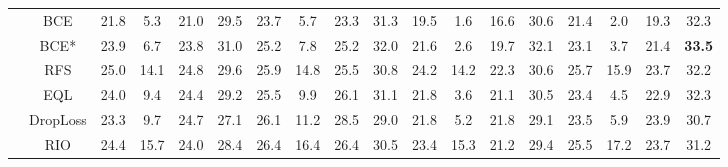 \documentclass[lettersize,journal]{IEEEtran}
\begin{document}
\begin{table*}[t]
{\begin{tabular}{c|c|cccccccc|cccccccc}
                                     & BCE\cite{ren2015faster}               & 21.8          & 5.3           & 21.0          & \multicolumn{1}{c|}{29.5}          & 23.7          & 5.7           & 23.3          & 31.3          & \multicolumn{1}{c|}{19.5}          & 1.6           & 16.6          & \multicolumn{1}{c|}{30.6}          & \multicolumn{1}{c|}{21.4}          & 2.0           & 19.3          & 32.3          \\
                                     & BCE*\cite{ren2015faster}                   & 23.9          & 6.7           & 23.8          & \multicolumn{1}{c|}{31.0}          & 25.2          & 7.8           & 25.2          & 32.0          & \multicolumn{1}{c|}{21.6}          & 2.6           & 19.7          & \multicolumn{1}{c|}{32.1}          & \multicolumn{1}{c|}{23.1}          & 3.7           & 21.4          & \textbf{33.5} \\
                                     & RFS\cite{gupta2019lvis}                      & 25.0          & 14.1          & 24.8          & \multicolumn{1}{c|}{29.6}          & 25.9          & 14.8          & 25.5          & 30.8          & \multicolumn{1}{c|}{24.2}          & 14.2          & 22.3          & \multicolumn{1}{c|}{30.6}          & \multicolumn{1}{c|}{25.7}          & 15.9          & 23.7          & 32.2          \\
                                     & EQL\cite{tan2020equalization}                      & 24.0          & 9.4           & 24.4          & \multicolumn{1}{c|}{29.2}          & 25.5          & 9.9           & 26.1          & 31.1          & \multicolumn{1}{c|}{21.8}          & 3.6           & 21.1          & \multicolumn{1}{c|}{30.5}          & \multicolumn{1}{c|}{23.4}          & 4.5           & 22.9          & 32.3          \\
                                     & DropLoss\cite{hsieh2021droploss}                  & 23.3          & 9.7           & 24.7          & \multicolumn{1}{c|}{27.1}          & 26.1          & 11.2          & 28.5          & 29.0          & \multicolumn{1}{c|}{21.8}          & 5.2           & 21.8          & \multicolumn{1}{c|}{29.1}          & \multicolumn{1}{c|}{23.5}          & 5.9           & 23.9          & 30.7          \\
                                     & RIO\cite{chang2021image}                      & 24.4          & 15.7          & 24.0          & \multicolumn{1}{c|}{28.4}          & 26.4          & 16.4          & 26.4          & 30.5          & \multicolumn{1}{c|}{23.4}          & 15.3          & 21.2          & \multicolumn{1}{c|}{29.4}          & \multicolumn{1}{c|}{25.5}          & 17.2          & 23.7          & 31.2          \\

\end{tabular}}
\end{table*}
\end{document}

